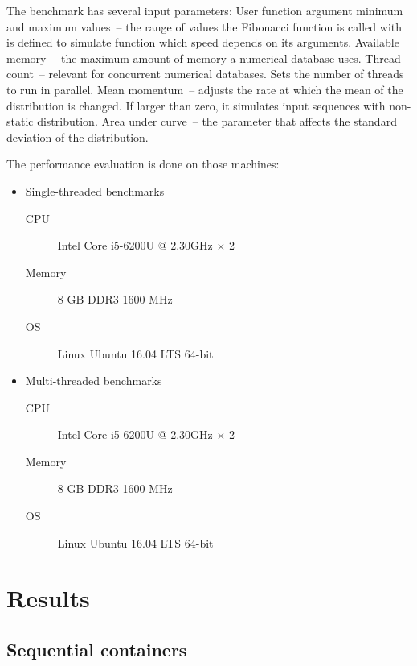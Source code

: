 The benchmark has several input parameters:
User function argument minimum and maximum values~-- the range of values the Fibonacci function is called with is defined to simulate function which speed depends on its arguments.
Available memory~-- the maximum amount of memory a numerical database uses.
Thread count~-- relevant for concurrent numerical databases. Sets the number of  threads to run in parallel.
Mean momentum~-- adjusts the rate at which the mean of the distribution is changed. If larger than zero, it simulates input sequences with non-static distribution.
Area under curve~-- the parameter that affects the standard deviation of the distribution.

The performance evaluation is done on those machines:
\begin{itemize}
\item Single-threaded benchmarks
\begin{description}
\item [CPU] Intel\textregistered{} Core\texttrademark{} i5-6200U @ 2.30GHz $ \times $ 2
\item [Memory] 8 GB DDR3 1600 MHz
\item [OS] Linux\textregistered{} Ubuntu\textregistered{} 16.04 LTS 64-bit
\end{description}
\item Multi-threaded benchmarks
\begin{description}
\item [CPU] Intel\textregistered{} Core\texttrademark{} i5-6200U @ 2.30GHz $ \times $ 2
\item [Memory] 8 GB DDR3 1600 MHz
\item [OS] Linux\textregistered{} Ubuntu\textregistered{} 16.04 LTS 64-bit
\end{description}
\end{itemize}


\section{Results}

\subsection{Sequential containers}
\label{sssec:seqbench}
